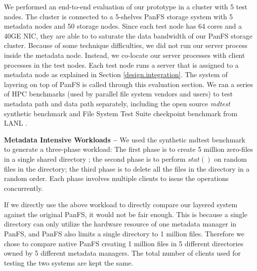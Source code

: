We performed an end-to-end evaluation of our prototype in a cluster with 5 test nodes.
The cluster is connected to a 5-shelves PanFS storage system
with 5 metadata nodes and 50 storage nodes.
Since each test node has 64 cores and a 40GE NIC, they are able to
to saturate the data bandwidth of our PanFS storage cluster.
Because of some technique difficulties,
we did not run our \sys server process inside the metadata node.
Instead, we co-locate our \sys server processes
with client processes in the test nodes.
Each test node runs a \sys server that is assigned to a metadata node
as explained in Section \ref{design.integration}.
The system of layering \sys on top of PanFS is called \psys through
this evaluation section.
We ran a series of HPC benchmarks (used by parallel file system vendors and users)
to test metadata path and data path separately,
including the open source \textit{mdtest} synthetic benchmark \cite{mdtest}
and File System Test Suite checkpoint benchmark from LANL \cite{mpiio}.

\textbf{Metadata Intensive Workloads -- }
We used the synthetic mdtest benchmark \cite{mdtest}
to generate a three-phase workload:
The first phase is to create 5 million
zero-files in a single shared directory \cite{ceph:weil06, GIGA11};
the second phase is to perform $stat()$ on random files in the directory;
the third phase is to delete all the files in the directory in a random order.
Each phase involves multiple clients to issue the operations concurrently.

If we directly use the above workload to directly compare our layered system
against the original PanFS, it would not be fair enough.
This is because a single directory can only utilize the hardware resource
of one metadata manager in PanFS,
and PanFS also limits a single directory to 1 million files.
Therefore we chose to compare native PanFS creating 1 million files
in 5 different directories owned by 5 different metadata managers.
The total number of clients used for testing the two systems
are kept the same.

